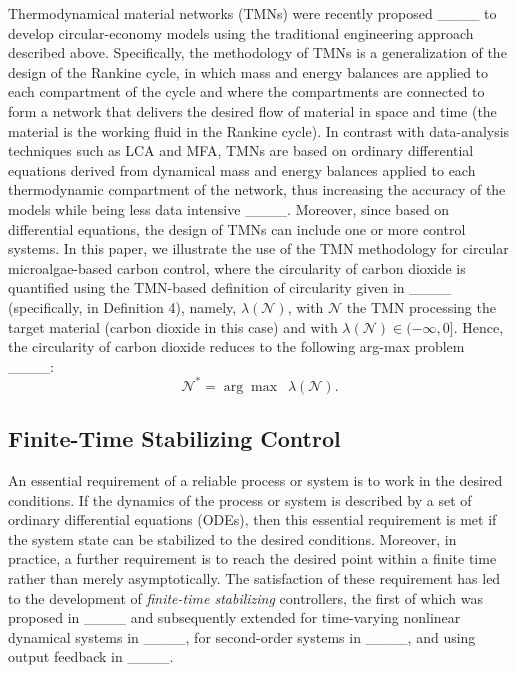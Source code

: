 Thermodynamical material networks (TMNs) were recently proposed ____ to develop circular-economy models using the traditional engineering approach described above. Specifically, the methodology of TMNs is a generalization of the design of the Rankine cycle, in which mass and energy balances are applied to each compartment of the cycle and where the compartments are connected to form a network that delivers the desired flow of material in space and time (the material is the working fluid in the Rankine cycle). In contrast with data-analysis techniques such as LCA and MFA, TMNs are based on ordinary differential equations derived from dynamical mass and energy balances applied to each thermodynamic compartment of the network, thus increasing the accuracy of the models while being less data intensive ____. Moreover, since based on differential equations, the design of TMNs can include one or more control systems. In this paper, we illustrate the use of the TMN methodology for circular microalgae-based carbon control, where the circularity of carbon dioxide is quantified using the TMN-based definition of circularity given in ____ (specifically, in Definition 4), namely, $\lambda(\mathcal{N})$, with $\mathcal{N}$ the TMN processing the target material (carbon dioxide in this case) and with $\lambda(\mathcal{N}) \in (-\infty,0]$. Hence, the circularity of carbon dioxide reduces to the following arg-max problem ____:
\begin{equation}\label{eq:circProblem}
\mathcal{N}^* = \arg \max \,\,\, \lambda(\mathcal{N}).  
\end{equation}
      
       



\subsection{Finite-Time Stabilizing Control}
An essential requirement of a reliable process or system is to work in the desired conditions. If the dynamics of the process or system is described by a set of ordinary differential equations (ODEs), then this essential requirement is met if the system state can be stabilized to the desired conditions. Moreover, in practice, a further requirement is to reach the desired point within a finite time rather than merely asymptotically. The satisfaction of these requirement has led to the development of \emph{finite-time stabilizing} controllers, the first of which was proposed in ____ and subsequently extended for time-varying nonlinear dynamical systems in ____, for second-order systems in ____, and using output feedback in ____.    

